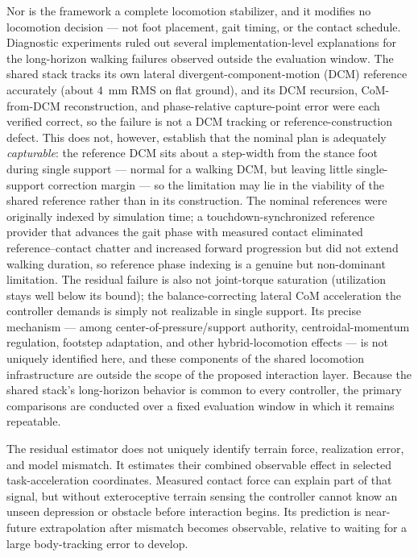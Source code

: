 \documentclass[journal]{IEEEtran}
\theoremstyle{plain}
\theoremstyle{definition}
\theoremstyle{remark}
\begin{document}
Nor is the framework a complete locomotion stabilizer, and it modifies no locomotion decision --- not foot placement, gait timing, or the contact schedule. Diagnostic experiments ruled out several implementation-level explanations for the long-horizon walking failures observed outside the evaluation window. The shared stack tracks its own lateral divergent-component-motion (DCM) reference accurately (about $4$~mm RMS on flat ground), and its DCM recursion, CoM-from-DCM reconstruction, and phase-relative capture-point error were each verified correct, so the failure is not a DCM tracking or reference-construction defect. This does not, however, establish that the nominal plan is adequately \emph{capturable}: the reference DCM sits about a step-width from the stance foot during single support --- normal for a walking DCM, but leaving little single-support correction margin --- so the limitation may lie in the viability of the shared reference rather than in its construction. The nominal references were originally indexed by simulation time; a touchdown-synchronized reference provider that advances the gait phase with measured contact eliminated reference--contact chatter and increased forward progression but did not extend walking duration, so reference phase indexing is a genuine but non-dominant limitation. The residual failure is also not joint-torque saturation (utilization stays well below its bound); the balance-correcting lateral CoM acceleration the controller demands is simply not realizable in single support. Its precise mechanism --- among center-of-pressure/support authority, centroidal-momentum regulation, footstep adaptation, and other hybrid-locomotion effects --- is not uniquely identified here, and these components of the shared locomotion infrastructure are outside the scope of the proposed interaction layer. Because the shared stack's long-horizon behavior is common to every controller, the primary comparisons are conducted over a fixed evaluation window in which it remains repeatable.

The residual estimator does not uniquely identify terrain force, realization error, and model mismatch. It estimates their combined observable effect in selected task-acceleration coordinates. Measured contact force can explain part of that signal, but without exteroceptive terrain sensing the controller cannot know an unseen depression or obstacle before interaction begins. Its prediction is near-future extrapolation after mismatch becomes observable, relative to waiting for a large body-tracking error to develop.
\end{document}
